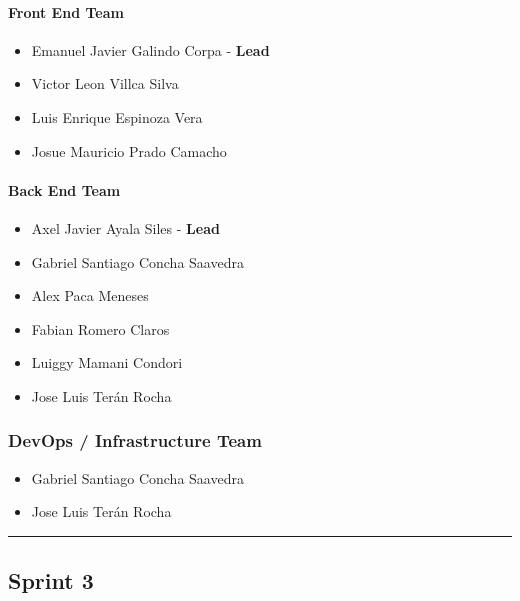\documentclass{article}
\providecommand{\tightlist}{
  \setlength{\itemsep}{0pt}\setlength{\parskip}{0pt}}
\begin{document}
\paragraph{Front End Team}\label{front-end-team-2}

\begin{itemize}
\tightlist
\item
  Emanuel Javier Galindo Corpa - \textbf{Lead}
\item
  Victor Leon Villca Silva
\item
  Luis Enrique Espinoza Vera
\item
  Josue Mauricio Prado Camacho
\end{itemize}

\paragraph{Back End Team}\label{back-end-team-2}

\begin{itemize}
\tightlist
\item
  Axel Javier Ayala Siles - \textbf{Lead}
\item
  Gabriel Santiago Concha Saavedra
\item
  Alex Paca Meneses
\item
  Fabian Romero Claros
\item
  Luiggy Mamani Condori
\item
  Jose Luis Terán Rocha
\end{itemize}

\subsubsection{DevOps / Infrastructure Team}\label{devops-team-2}

\begin{itemize}
\tightlist
\item
  Gabriel Santiago Concha Saavedra
\item
  Jose Luis Terán Rocha
\end{itemize}

\begin{center}\rule{0.5\linewidth}{0.5pt}\end{center}

\hypertarget{sprint3}{
\subsection{\texorpdfstring{\textbf{Sprint
3}}{Sprint 3}}\label{sprint3}}
\end{document}
